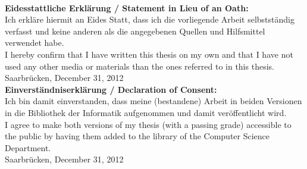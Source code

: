 \clearpage
\thispagestyle{empty}
~
\vfill
\begin{flushleft}
{
        \small
%
	\textbf{Eidesstattliche Erkl\"arung / Statement in Lieu of an Oath:}\\
	Ich erkl\"are hiermit an Eides Statt, dass ich die vorliegende Arbeit selbstst\"andig verfasst und keine
anderen als die angegebenen Quellen und Hilfsmittel verwendet habe.\\
	I hereby confirm that I have written this thesis on my own and that I have not used any other media or
materials than the ones referred to in this thesis.\\[\baselineskip]
	Saarbr\"ucken, December 31, 2012\\
\vspace{4cm}
	\textbf{Einverst\"andniserkl\"arung / Declaration of Consent:}\\
	Ich bin damit einverstanden, dass meine (bestandene) Arbeit in beiden Versionen in die Bibliothek der
Informatik aufgenommen und damit ver\"offentlicht wird.\\
	I agree to make both versions of my thesis (with a passing grade) accessible to the public by having
them added to the library of the Computer Science Department.\\[\baselineskip]
	Saarbr\"ucken, December 31, 2012
\vspace{3cm}
}
\end{flushleft}


